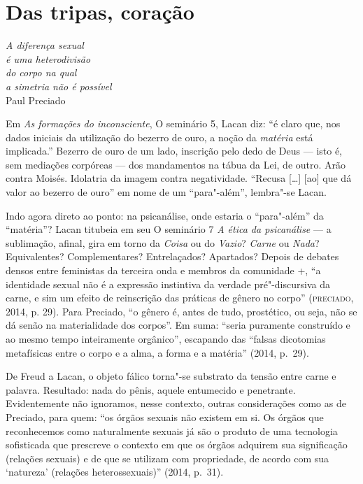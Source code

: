 \section{Das tripas, coração}

\begin{flushright}
\footnotesize
\emph{A diferença sexual\\
é uma heterodivisão\\
do corpo na qual\\
a simetria não é possível}\\
Paul Preciado
\end{flushright}

Em \emph{As formações do inconsciente}, O seminário 5, Lacan diz: ``é
claro que, nos dados iniciais da utilização do bezerro de ouro, a noção
da \emph{matéria} está implicada.'' Bezerro de ouro de um lado,
inscrição pelo dedo de Deus --- isto é, sem mediações corpóreas --- dos
mandamentos na tábua da Lei, de outro. Arão contra Moisés. Idolatria da
imagem contra negatividade. ``Recusa {[}\ldots{}{]} {[}ao{]} que dá valor ao
bezerro de ouro'' em nome de um ``para"-além'', lembra"-se Lacan.

Indo agora direto ao ponto: na psicanálise, onde estaria o ``para"-além''
da ``matéria''? Lacan titubeia em seu O seminário 7 \emph{A ética
da psicanálise} --- a sublimação, afinal, gira em torno da \emph{Coisa}
ou do \emph{Vazio}? \emph{Carne} ou \emph{Nada}? Equivalentes?
Complementares? Entrelaçados? Apartados? Depois de debates densos entre
feministas da terceira onda e membros da comunidade +, ``a
identidade sexual não é a expressão instintiva da verdade pré"-discursiva
da carne, e sim um efeito de reinscrição das práticas de gênero no
corpo'' (\textsc{preciado}, 2014, p. 29). Para Preciado, ``o gênero é, antes
de tudo, prostético, ou seja, não se dá senão na materialidade dos
corpos''. Em suma: ``seria puramente construído e ao mesmo tempo
inteiramente orgânico'', escapando das ``falsas dicotomias metafísicas
entre o corpo e a alma, a forma e a matéria'' (2014, p.~29).

De Freud a Lacan, o objeto fálico torna"-se substrato da tensão entre
carne e palavra. Resultado: nada do pênis, aquele entumecido e
penetrante. Evidentemente não ignoramos, nesse contexto, outras
considerações como as de Preciado, para quem: ``os órgãos sexuais não
existem em si. Os órgãos que reconhecemos como naturalmente sexuais já
são o produto de uma tecnologia sofisticada que prescreve o contexto em
que os órgãos adquirem sua significação (relações sexuais) e de que se
utilizam com propriedade, de acordo com sua `natureza' (relações
heterossexuais)'' (2014, p.~31).

